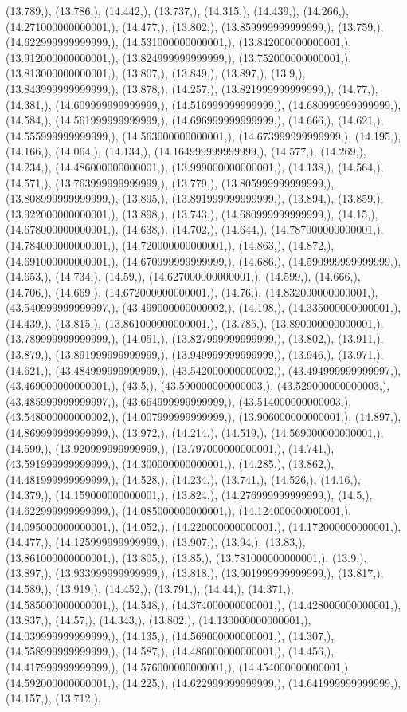 \documentclass{article}
\begin{document}
(13.789,), (13.786,), (14.442,), (13.737,), (14.315,), (14.439,), (14.266,), (14.271000000000001,), (14.477,), (13.802,), (13.859999999999999,), (13.759,), (14.622999999999999,), (14.531000000000001,), (13.842000000000001,), (13.912000000000001,), (13.824999999999999,), (13.752000000000001,), (13.813000000000001,), (13.807,), (13.849,), (13.897,), (13.9,), (13.843999999999999,), (13.878,), (14.257,), (13.821999999999999,), (14.77,), (14.381,), (14.609999999999999,), (14.516999999999999,), (14.680999999999999,), (14.584,), (14.561999999999999,), (14.696999999999999,), (14.666,), (14.621,), (14.555999999999999,), (14.563000000000001,), (14.673999999999999,), (14.195,), (14.166,), (14.064,), (14.134,), (14.164999999999999,), (14.577,), (14.269,), (14.234,), (14.486000000000001,), (13.999000000000001,), (14.138,), (14.564,), (14.571,), (13.763999999999999,), (13.779,), (13.805999999999999,), (13.808999999999999,), (13.895,), (13.891999999999999,), (13.894,), (13.859,), (13.922000000000001,), (13.898,), (13.743,), (14.680999999999999,), (14.15,), (14.678000000000001,), (14.638,), (14.702,), (14.644,), (14.787000000000001,), (14.784000000000001,), (14.720000000000001,), (14.863,), (14.872,), (14.691000000000001,), (14.670999999999999,), (14.686,), (14.590999999999999,), (14.653,), (14.734,), (14.59,), (14.627000000000001,), (14.599,), (14.666,), (14.706,), (14.669,), (14.672000000000001,), (14.76,), (14.832000000000001,), (43.540999999999997,), (43.499000000000002,), (14.198,), (14.335000000000001,), (14.439,), (13.815,), (13.861000000000001,), (13.785,), (13.890000000000001,), (13.789999999999999,), (14.051,), (13.827999999999999,), (13.802,), (13.911,), (13.879,), (13.891999999999999,), (13.949999999999999,), (13.946,), (13.971,), (14.621,), (43.484999999999999,), (43.542000000000002,), (43.494999999999997,), (43.469000000000001,), (43.5,), (43.590000000000003,), (43.529000000000003,), (43.485999999999997,), (43.664999999999999,), (43.514000000000003,), (43.548000000000002,), (14.007999999999999,), (13.906000000000001,), (14.897,), (14.869999999999999,), (13.972,), (14.214,), (14.519,), (14.569000000000001,), (14.599,), (13.920999999999999,), (13.797000000000001,), (14.741,), (43.591999999999999,), (14.300000000000001,), (14.285,), (13.862,), (14.481999999999999,), (14.528,), (14.234,), (13.741,), (14.526,), (14.16,), (14.379,), (14.159000000000001,), (13.824,), (14.276999999999999,), (14.5,), (14.622999999999999,), (14.085000000000001,), (14.124000000000001,), (14.095000000000001,), (14.052,), (14.220000000000001,), (14.172000000000001,), (14.477,), (14.125999999999999,), (13.907,), (13.94,), (13.83,), (13.861000000000001,), (13.805,), (13.85,), (13.781000000000001,), (13.9,), (13.897,), (13.933999999999999,), (13.818,), (13.901999999999999,), (13.817,), (14.589,), (13.919,), (14.452,), (13.791,), (14.44,), (14.371,), (14.585000000000001,), (14.548,), (14.374000000000001,), (14.428000000000001,), (13.837,), (14.57,), (14.343,), (13.802,), (14.130000000000001,), (14.039999999999999,), (14.135,), (14.569000000000001,), (14.307,), (14.558999999999999,), (14.587,), (14.486000000000001,), (14.456,), (14.417999999999999,), (14.576000000000001,), (14.454000000000001,), (14.592000000000001,), (14.225,), (14.622999999999999,), (14.641999999999999,), (14.157,), (13.712,), 
\end{document}
